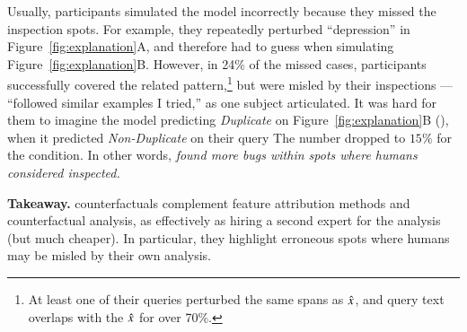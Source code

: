 Usually, participants simulated the model incorrectly because they missed the inspection spots.
For example, they repeatedly perturbed ``depression'' in Figure~\ref{fig:explanation}A, and therefore had to guess when simulating Figure~\ref{fig:explanation}B.
However, in 24\% of the missed \cshap cases, participants successfully covered the related pattern,\footnote{At least one of their queries perturbed the same spans as $\hat{x}$, and query text overlaps with the $\hat{x}$ for over 70\%.} but were misled by their inspections --- ``followed similar examples I tried,'' as one subject articulated.
It was hard for them to imagine the model predicting \emph{Duplicate} on Figure~\ref{fig:explanation}B (), when it predicted \emph{Non-Duplicate} on their query 
The number dropped to $15\%$ for the \chuman condition.
In other words, \emph{\cshap found more bugs within spots where humans considered inspected.}

\noindent\textbf{Takeaway.}
\sysname counterfactuals complement feature attribution methods and counterfactual analysis, as effectively as hiring a second expert for the analysis (but much cheaper).
In particular, they highlight erroneous spots where humans may be misled by their own analysis.
